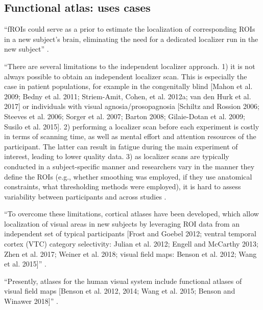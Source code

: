 



\subsection{Functional atlas: uses cases}


``fROIs could serve as a prior to estimate the localization of corresponding
ROIs in a new subject's brain, eliminating the need for a dedicated localizer
run in the new subject'' \citep{rosenke2021probabilistic}.

``There are several limitations to the independent localizer approach.
%
1) it is not always possible to obtain an independent localizer scan.
%
This is especially the case in patient populations, for example in the
congenitally blind [Mahon et al. 2009; Bedny et al. 2011; Striem-Amit, Cohen, et
al. 2012a; van den Hurk et al. 2017] or individuals with visual
agnosia/prosopagnosia [Schiltz and Rossion 2006; Steeves et al. 2006; Sorger et
al.  2007; Barton 2008; Gilaie-Dotan et al. 2009; Susilo et al. 2015].
%
2) performing a localizer scan before each experiment is costly in terms of
scanning time, as well as mental effort and attention resources of the
participant.
%
The latter can result in fatigue during the main experiment of interest, leading
to lower quality data.
%
3) as localizer scans are typically conducted in a subject-specific manner and
researchers vary in the manner they define the ROIs (e.g., whether smoothing was
employed, if they use anatomical constraints, what thresholding methods were
employed), it is hard to assess variability between participants and across
studies \citep{rosenke2021probabilistic}.

``To overcome these limitations, cortical atlases have been developed, which
allow localization of visual areas in new subjects by leveraging ROI data from
an independent set of typical participants [Frost and Goebel 2012; ventral
temporal cortex (VTC) category selectivity: Julian et al. 2012; Engell and
McCarthy 2013; Zhen et al.  2017; Weiner et al. 2018; visual field maps: Benson
et al. 2012; Wang et al. 2015]'' \citep{rosenke2021probabilistic}.

``Presently, atlases for the human visual system include functional atlases of
visual field maps [Benson et al. 2012, 2014; Wang et al. 2015; Benson and
Winawer 2018]'' \citep{rosenke2021probabilistic}.

